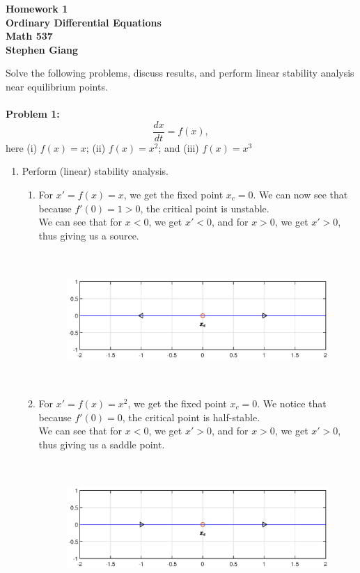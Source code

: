 \documentclass[11pt]{article}
\newcommand{\skipline}{\vspace{\baselineskip}}
\newenvironment{problem}[1]{\textbf{Problem #1: }}{\newpage}
\begin{document}
	
	\begin{center}
		\textbf{Homework 1} \\
		\textbf{Ordinary Differential Equations} \\
		\textbf{Math 537} \\
		\textbf{Stephen Giang} \\
	\end{center}
	\skipline
	Solve the following problems, discuss results, and perform linear stability analysis near equilibrium points.
	\\ \\
	\begin{problem}{1}
		$$\frac{dx}{dt} = f(x),$$
		here (i) $f(x) = x$; (ii) $f(x) = x^2$; and (iii) $f(x) = x^3$
		\\	
		\begin{enumerate}[label = (\alph*)]
			\item Perform (linear) stability analysis.
			\begin{enumerate}[label = (\roman*)]
				\item For $x' = f(x) = x$, we get the fixed point $x_c = 0$.  We can now see that because $f'(0) = 1 > 0$, the critical point is unstable. \\  
				We can see that for $x < 0$, we get $x' < 0$, and for $x > 0$, we get $x'> 0$, thus giving us a source. 
				\begin{figure}[h!]
					\includegraphics[width = 16cm, height = 5cm]{PhaseLine1i.eps}
				\end{figure}
				\item For $x' = f(x) = x^2$, we get the fixed point $x_c = 0$.  We notice that because $f'(0) = 0$, the critical point is half-stable.  \\
				We can see that for $x < 0$, we get $x' > 0$, and for $x > 0$, we get $x'> 0$, thus giving us a saddle point.
				\begin{figure}[h!]
					\includegraphics[width = 16cm, height = 5cm]{PhaseLine1ii.eps}

\end{figure}
\end{enumerate}
\end{enumerate}
\end{problem}
\end{document}
